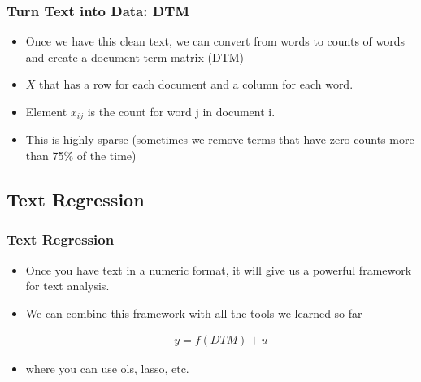 \documentclass[
  shownotes,
  xcolor={svgnames},
  hyperref={colorlinks,citecolor=DarkBlue,linkcolor=DarkRed,urlcolor=DarkBlue}
  , aspectratio=169]{beamer}
\begin{document}
\begin{frame}[fragile]
\frametitle{Turn Text into Data: DTM}

\begin{itemize}
\item Once we have this clean text, we can convert from words to counts of words and create a document-term-matrix (DTM)
\medskip
\item $X$ that has a row for each document and a column for each word. 
\medskip
\item Element $x_{ij}$ is the count for word j in document i.
\medskip
\item This is highly sparse (sometimes we remove terms that have zero counts more than 75\% of the time)
\end{itemize}
\end{frame}
\subsection{Text Regression}
\begin{frame}
\frametitle{Text Regression}

\begin{itemize}
\item Once you have text in a numeric format, it will give us a powerful framework for text analysis.
\medskip
\item We can combine this framework with all the tools we learned so far



\medskip
\begin{align}
y= f(DTM) + u
\end{align}
 
\item where you can use ols, lasso, etc.

\end{itemize}
\end{frame}
\end{document}
